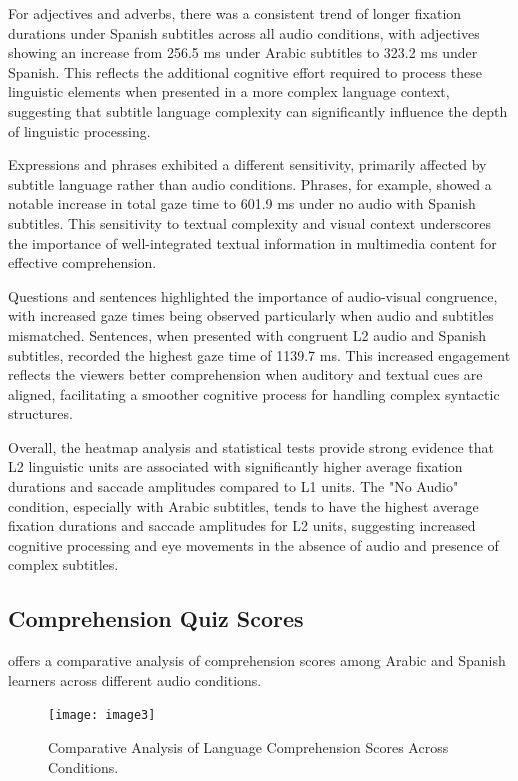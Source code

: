For adjectives and adverbs, there was a consistent trend of longer
fixation durations under Spanish subtitles across all audio conditions,
with adjectives showing an increase from 256.5 ms under Arabic subtitles
to 323.2 ms under Spanish. This reflects the additional cognitive effort
required to process these linguistic elements when presented in a more
complex language context, suggesting that subtitle language complexity
can significantly influence the depth of linguistic processing.

Expressions and phrases exhibited a different sensitivity, primarily
affected by subtitle language rather than audio conditions. Phrases, for
example, showed a notable increase in total gaze time to 601.9 ms under
no audio with Spanish subtitles. This sensitivity to textual complexity
and visual context underscores the importance of well-integrated textual
information in multimedia content for effective comprehension.

Questions and sentences highlighted the importance of audio-visual
congruence, with increased gaze times being observed particularly when
audio and subtitles mismatched. Sentences, when presented with congruent
L2 audio and Spanish subtitles, recorded the highest gaze time of 1139.7
ms. This increased engagement reflects the viewer\textquotesingle s
better comprehension when auditory and textual cues are aligned,
facilitating a smoother cognitive process for handling complex syntactic
structures.

Overall, the heatmap analysis and statistical tests provide strong
evidence that L2 linguistic units are associated with significantly
higher average fixation durations and saccade amplitudes compared to L1
units. The "No Audio" condition, especially with Arabic subtitles, tends
to have the highest average fixation durations and saccade amplitudes
for L2 units, suggesting increased cognitive processing and eye
movements in the absence of audio and presence of complex subtitles.

\subsection{Comprehension Quiz Scores}\label{sub-sec-comprehensionquiz}

 offers a comparative analysis of comprehension scores among
Arabic and Spanish learners across different audio conditions.

\begin{figure}[htbp]
\centering
\caption{Comparative Analysis of Language Comprehension Scores Across Conditions.}
\label{fig-03}
\texttt{[image: image3]}
\end{figure}

